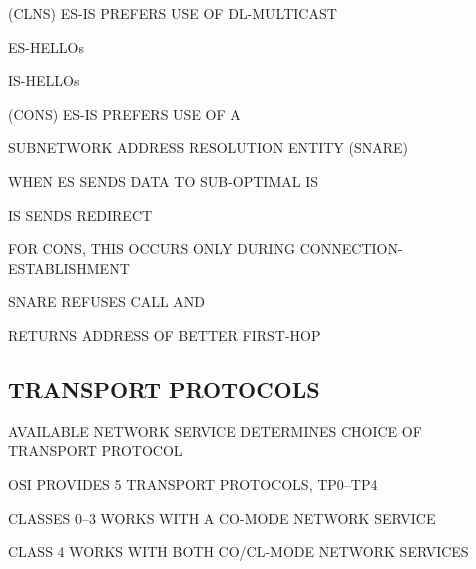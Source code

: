 \begin{bwslide}

\begin{nrtc}
\item	(CLNS) ES-IS PREFERS USE OF DL-MULTICAST
    \begin{nrtc}
    \item	ES-HELLOs

    \item	IS-HELLOs
    \end{nrtc}

\item	(CONS) ES-IS PREFERS USE OF A
    \begin{nrtc}
    \item	SUBNETWORK ADDRESS RESOLUTION ENTITY (SNARE)
    \end{nrtc}

\item	WHEN ES SENDS DATA TO SUB-OPTIMAL IS
    \begin{nrtc}
    \item	IS SENDS REDIRECT
    \end{nrtc}

\item	FOR CONS, THIS OCCURS ONLY DURING CONNECTION-ESTABLISHMENT
    \begin{nrtc}
    \item	SNARE REFUSES CALL AND

    \item	RETURNS ADDRESS OF BETTER FIRST-HOP
    \end{nrtc}
\end{nrtc}
\end{bwslide}


\begin{bwslide}
\part*	{TRANSPORT PROTOCOLS}\bf

\begin{nrtc}
\item	AVAILABLE NETWORK SERVICE DETERMINES CHOICE OF TRANSPORT PROTOCOL

\item	OSI PROVIDES 5 TRANSPORT PROTOCOLS, TP0--TP4
    \begin{nrtc}
    \item	CLASSES 0--3 WORKS WITH A CO-MODE NETWORK SERVICE

    \item	CLASS 4 WORKS WITH BOTH CO/CL-MODE NETWORK SERVICES
    \end{nrtc}
\end{nrtc}
\end{bwslide}


